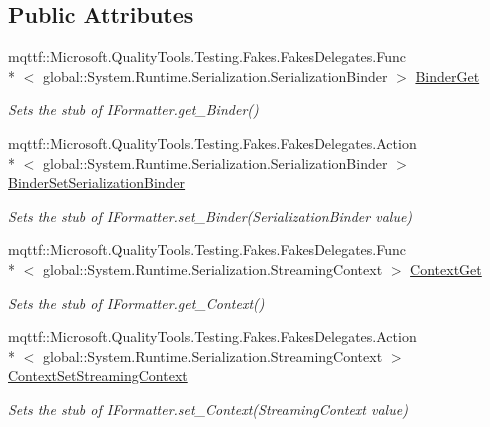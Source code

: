 \subsection*{Public Attributes}
\begin{DoxyCompactItemize}
\item 
mqttf\-::\-Microsoft.\-Quality\-Tools.\-Testing.\-Fakes.\-Fakes\-Delegates.\-Func\\*
$<$ global\-::\-System.\-Runtime.\-Serialization.\-Serialization\-Binder $>$ \hyperlink{class_system_1_1_runtime_1_1_serialization_1_1_fakes_1_1_stub_i_formatter_af96ae7eeccf7bf1d8df9048ecda1c1e7}{Binder\-Get}
\begin{DoxyCompactList}\small\item\em Sets the stub of I\-Formatter.\-get\-\_\-\-Binder()\end{DoxyCompactList}\item 
mqttf\-::\-Microsoft.\-Quality\-Tools.\-Testing.\-Fakes.\-Fakes\-Delegates.\-Action\\*
$<$ global\-::\-System.\-Runtime.\-Serialization.\-Serialization\-Binder $>$ \hyperlink{class_system_1_1_runtime_1_1_serialization_1_1_fakes_1_1_stub_i_formatter_a742d7d117eb9203070abc3c4a8580e7c}{Binder\-Set\-Serialization\-Binder}
\begin{DoxyCompactList}\small\item\em Sets the stub of I\-Formatter.\-set\-\_\-\-Binder(\-Serialization\-Binder value)\end{DoxyCompactList}\item 
mqttf\-::\-Microsoft.\-Quality\-Tools.\-Testing.\-Fakes.\-Fakes\-Delegates.\-Func\\*
$<$ global\-::\-System.\-Runtime.\-Serialization.\-Streaming\-Context $>$ \hyperlink{class_system_1_1_runtime_1_1_serialization_1_1_fakes_1_1_stub_i_formatter_aab65ae3a58ff2ef55d7ffc6ed1d292f5}{Context\-Get}
\begin{DoxyCompactList}\small\item\em Sets the stub of I\-Formatter.\-get\-\_\-\-Context()\end{DoxyCompactList}\item 
mqttf\-::\-Microsoft.\-Quality\-Tools.\-Testing.\-Fakes.\-Fakes\-Delegates.\-Action\\*
$<$ global\-::\-System.\-Runtime.\-Serialization.\-Streaming\-Context $>$ \hyperlink{class_system_1_1_runtime_1_1_serialization_1_1_fakes_1_1_stub_i_formatter_a8dafc45d8ea4d479d96ea119c9dea8d4}{Context\-Set\-Streaming\-Context}
\begin{DoxyCompactList}\small\item\em Sets the stub of I\-Formatter.\-set\-\_\-\-Context(\-Streaming\-Context value)\end{DoxyCompactList}\item 

\end{DoxyCompactItemize}
